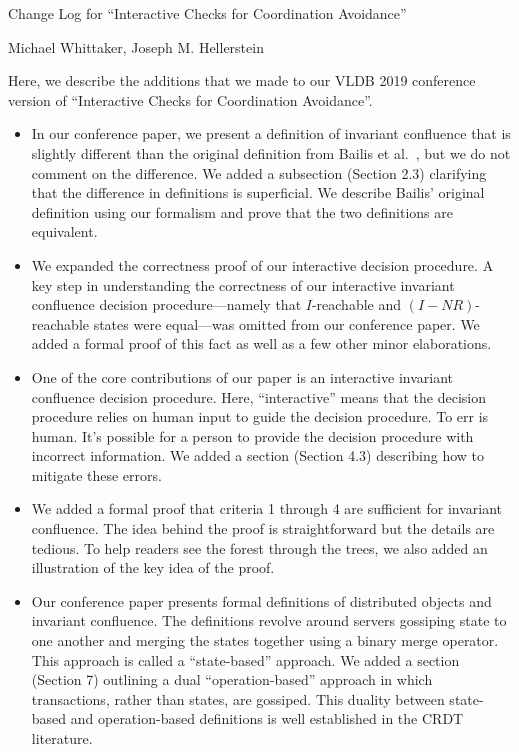 \documentclass[12pt]{article}
\begin{document}
\begin{center}
  {\huge Change Log for ``Interactive Checks for Coordination Avoidance''}

  Michael Whittaker, Joseph M. Hellerstein
\end{center}

Here, we describe the additions that we made to our VLDB 2019 conference
version of ``Interactive Checks for Coordination Avoidance''.

\begin{itemize}
  \item
    In our conference paper, we present a definition of invariant confluence
    that is slightly different than the original definition from Bailis et
    al.~\cite{bailis2014coordination}, but we do not comment on the difference.
    We added a  subsection (Section 2.3) clarifying that the difference in
    definitions is superficial. We describe Bailis' original definition using
    our formalism and prove that the two definitions are equivalent.

  \item
    We expanded the correctness proof of our interactive decision procedure. A
    key step in understanding the correctness of our interactive invariant
    confluence decision procedure---namely that $I$-reachable and
    $(I-NR)$-reachable states were equal---was omitted from our conference
    paper. We added a formal proof of this fact as well as a few other minor
    elaborations.

  \item
    One of the core contributions of our paper is an interactive invariant
    confluence decision procedure. Here, ``interactive'' means that the
    decision procedure relies on human input to guide the decision procedure.
    To err is human. It's possible for a person to provide the decision
    procedure with incorrect information. We added a section (Section 4.3)
    describing how to mitigate these errors.

  \item
    We added a formal proof that criteria 1 through 4 are sufficient for
    invariant confluence. The idea behind the proof is straightforward but the
    details are tedious. To help readers see the forest through the trees, we
    also added an illustration of the key idea of the proof.

  \item
    Our conference paper presents formal definitions of distributed objects and
    invariant confluence. The definitions revolve around servers gossiping
    state to one another and merging the states together using a binary merge
    operator. This approach is called a ``state-based'' approach. We added a
    section (Section 7) outlining a dual ``operation-based'' approach in which
    transactions, rather than states, are gossiped. This duality between
    state-based and operation-based definitions is well established in the CRDT
    literature.


\end{itemize}
\end{document}
